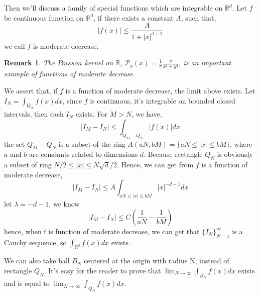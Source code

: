 \documentclass[a4paper]{article}
\newtheorem{remark}{Remark}
\numberwithin{equation}{subsection}
\begin{document}
\par Then we'll discuss a family of special functions which are integrable on $\mathbb{R}^d$. Let $f$ be continuous function on $\mathbb{R}^d$, if there exists a constant $A$, such that,
\begin{equation}
    |f(x)| \leq \frac{A}{1+|x|^{d+1}}
\end{equation}
we call $f$ is moderate decrease.
\begin{remark}
    The $Poisson$ kernel on $\mathbb{R}$, $\mathcal{P}_y(x) = \frac{1}{\pi} \frac{y}{x^2+y^2}$, is an important example of functions of moderate decrease.
\end{remark}

\par We assert that, if $f$ is a function of moderate decrease, the limit above exists. Let $I_N = \int_{Q_N} f(x)dx$, since $f$ is continuous, it's integrable on bounded closed intervals, then each $I_N$ exists. For $M > N$, we have,
\begin{equation}
    |I_M - I_N| \leq \int_{Q_M-Q_N} |f(x)| dx
\end{equation}
the set $Q_M - Q_N$ is a subset of the ring $A(aN, bM)=\{aN\leq |x| \leq bM\}$, where $a$ and $b$ are constants related to dimensions $d$. Because rectangle $Q_N$ is obviously a subset of ring $N/2 \leq |x| \leq N \sqrt{d}/2$. Hence, we can get from $f$ is a function of moderate decrease,
\begin{equation}
    |I_M - I_N| \leq A \int_{aN \leq |x| \leq bM} |x|^{-d-1} dx
\end{equation}
let $\lambda=-d-1$, we know
\begin{equation}
    |I_M - I_N| \leq C(\frac{1}{aN} - \frac{1}{bM})
\end{equation}
hence, when f is function of moderate decrease, we can get that $\{I_N\}_{N=1}^\infty$ is a Cauchy sequence, so $\int_{\mathbb{R}^d} f(x)dx$ exists.

\par We can also take ball $B_N$ centered at the origin with radius N, instead of rectangle $Q_N$. It's easy for the reader to prove that $\lim_{N\to\infty}\int_{B_N} f(x)dx$ exists and is equal to $\lim_{N\to\infty} \int_{Q_N} f(x)dx$.
\end{document}
